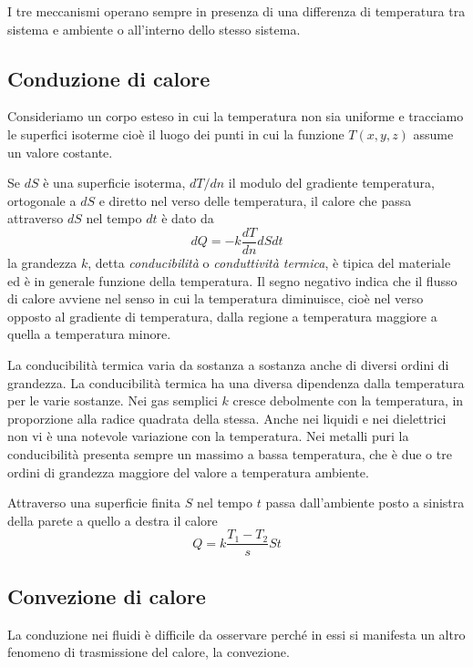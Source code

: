 \documentclass[class=book, crop=false, oneside, 12pt]{standalone}
\begin{document}
I tre meccanismi operano sempre in presenza di una differenza di temperatura tra sistema e ambiente o all'interno dello stesso sistema. 

\subsection{Conduzione di calore}

Consideriamo un corpo esteso in cui la temperatura non sia uniforme e tracciamo le superfici isoterme cioè il luogo dei punti in cui la funzione \(T(x,y,z)\) assume un valore costante.

Se \(d S\) è una superficie isoterma, \(d T / d n\) il modulo del gradiente temperatura, ortogonale a \(d S\) e diretto nel verso delle temperatura, il calore che passa attraverso \(d S\) nel tempo \(d t\) è dato da
\begin{equation}
    d Q = - k \frac{d T }{d n} d S d t
\end{equation}
la grandezza \(k\), detta \emph{conducibilità} o \emph{conduttività termica}, è tipica del materiale ed è in generale funzione della temperatura.
Il segno negativo indica che il flusso di calore avviene nel senso in cui la temperatura diminuisce, cioè nel verso opposto al gradiente di temperatura, dalla regione a temperatura maggiore a quella a temperatura minore.

La conducibilità termica varia da sostanza a sostanza anche di diversi ordini di grandezza.
La conducibilità termica ha una diversa dipendenza dalla temperatura per le varie sostanze. 
Nei gas semplici \(k\) cresce debolmente con la temperatura, in proporzione alla radice quadrata della stessa. 
Anche nei liquidi e nei dielettrici non vi è una notevole variazione con la temperatura. 
Nei metalli puri la conducibilità presenta sempre un massimo a bassa temperatura, che è due o tre ordini di grandezza maggiore del valore a temperatura ambiente.

Attraverso una superficie finita \(S\) nel tempo \(t\) passa dall'ambiente posto a sinistra della parete a quello a destra il calore 
\begin{equation*}
    Q = k \frac{T_1 - T_2}{s} S t
\end{equation*}

\subsection{Convezione di calore}

La conduzione nei fluidi è difficile da osservare perché in essi si manifesta un altro fenomeno di trasmissione del calore, la convezione.
\end{document}
